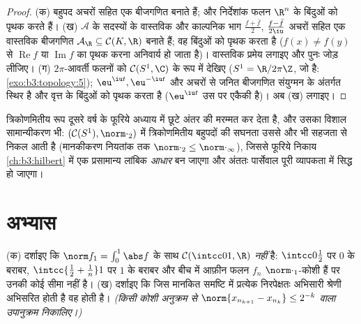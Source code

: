 \begin{proof}
(क) बहुपद अचरों सहित एक बीजगणित बनाते हैं; और निर्देशांक फलन
$\R^n$ के बिंदुओं को पृथक करते हैं।
(ख) $\mathcal A$ के सदस्यों के वास्तविक और काल्पनिक भाग $\frac{f + \bar f}2$, $\frac{f - \bar f}{2\iu}$
अचरों सहित एक वास्तविक बीजगणित $\mathcal A_\R \subseteq \mathcal C(K, \R)$ बनाते हैं; वह बिंदुओं को
पृथक करता है ($f(x) \ne f(y)$ से $\operatorname{Re}f$ या $\operatorname{Im}f$ का पृथक करना अनिवार्य हो
जाता है)। वास्तविक प्रमेय लगाइए और पुनः जोड़ लीजिए।
(ग) $2\pi$-आवर्ती फलनों को $\mathcal C(S^1, \C)$ के रूप में देखिए ($S^1 = \R/2\pi\Z$, जो 
है: \cref{exo:b3:topology:5}); $\eu^{\iu t}, \eu^{-\iu t}$ और अचरों से जनित बीजगणित संयुग्मन के अंतर्गत
स्थिर है और वृत्त के बिंदुओं को पृथक करता है ($\eu^{\iu t}$ उस पर एकैकी
है)। अब (ख) लगाइए।
\end{proof}

\begin{remark}\label{rem:b3:complete:swremark}
त्रिकोणमितीय रूप दूसरे वर्ष के फूरिये अध्याय में छूटे अंतर की
मरम्मत कर देता है, और उसका विशाल सामान्यीकरण भी: $(\mathcal C(S^1), \norm\cdot_2)$ में
त्रिकोणमितीय बहुपदों की सघनता उससे और भी सहजता से निकल आती है
(मानकीकरण नियतांक तक $\norm\cdot_2 \leq \norm\cdot_\infty$), जिससे फूरिये निकाय \cref{ch:b3:hilbert} में एक
प्रसामान्य लांबिक \emph{आधार} बन जाएगा और अंततः पार्सेवाल पूरी
व्यापकता में सिद्ध हो जाएगा।
\end{remark}

\section{अभ्यास}

\begin{exercise}[$\star$]\label{exo:b3:complete:1}
(क) दर्शाइए कि $\norm f_1 = \int_0^1\abs f$ के साथ $\mathcal C(\intcc01, \R)$  \emph{नहीं} है: $\intcc0{\frac12}$ पर
$0$ के बराबर, $\intcc{\frac12 + \frac1n}1$ पर $1$ के बराबर और बीच में आफ़ीन फलन
$f_n$ $\norm\cdot_1$-कोशी हैं पर उनकी कोई  सीमा नहीं है।
(ख) दर्शाइए कि जिस मानकित समष्टि में प्रत्येक निरपेक्षतः अभिसारी
श्रेणी अभिसरित होती है वह  होती है। \emph{(किसी कोशी अनुक्रम
से $\norm{x_{n_{k+1}} -
x_{n_k}} \leq 2^{-k}$ वाला उपानुक्रम निकालिए।)}
\end{exercise}

